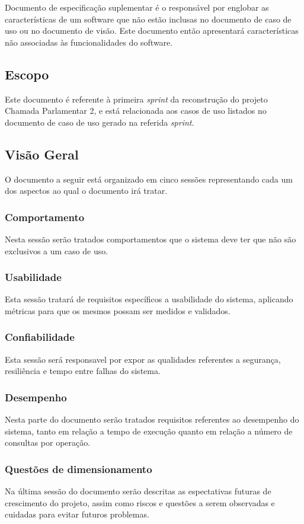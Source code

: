 Documento de especificação suplementar é o responsável por englobar as características de um software que não estão inclusas no documento de caso de uso ou no documento de visão. Este documento então apresentará características não associadas às funcionalidades do software. 

\subsection{Escopo}

Este documento é referente à primeira \textit{sprint} da reconstrução do projeto Chamada Parlamentar 2, e está relacionada aos casos de uso listados no documento de caso de uso gerado na referida \textit{sprint}.

\subsection{Visão Geral}

O documento a seguir está organizado em cinco sessões representando cada um dos aspectos ao qual o documento irá tratar.

\subsubsection{Comportamento}

Nesta sessão serão tratados comportamentos que o sistema deve ter que não são exclusivos a um caso de uso.

\subsubsection{Usabilidade}

Esta sessão tratará de requisitos específicos a usabilidade do sistema, aplicando métricas para que os mesmos possam ser medidos e validados.

\subsubsection{Confiabilidade}

Esta sessão será responsavel por expor as qualidades referentes a segurança, resiliência e tempo entre falhas do sistema.

\subsubsection{Desempenho}

Nesta parte do documento serão tratados requisitos referentes ao desempenho do sistema, tanto em relação a tempo de execução quanto em relação a número de consultas por operação.

\subsubsection{Questões de dimensionamento}

Na última sessão do documento serão descritas as espectativas futuras de crescimento do projeto, assim como riscos e questões a serem observadas e cuidadas para evitar futuros problemas.